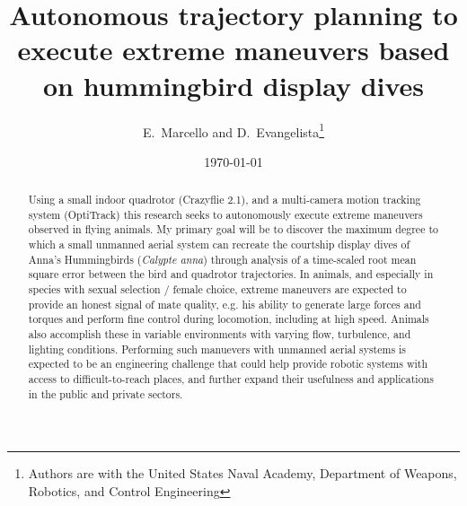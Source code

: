 \documentclass[onecolumn,10pt]{IEEEtran}
\title{Autonomous trajectory planning to execute extreme maneuvers based on hummingbird display dives}
\author{E.~Marcello and D.~Evangelista\thanks{Authors are with the United States Naval Academy, Department of Weapons, Robotics, and Control Engineering}}
\date{\today}
\begin{document}
\maketitlepage
\maketitle

\begin{abstract}
Using a small indoor quadrotor (Crazyflie 2.1), and a multi-camera motion tracking system (OptiTrack) this research seeks to autonomously execute extreme maneuvers observed in flying animals.  My primary goal will be to discover the maximum degree to which a small unmanned aerial system can recreate the courtship display dives of Anna's Hummingbirds (\emph{Calypte anna}) through analysis of a time-scaled root mean square error between the bird and quadrotor trajectories. In animals, and especially in species with sexual selection / female choice, extreme maneuvers are expected to provide an honest signal of mate quality, e.g. his ability to generate large forces and torques and perform fine control during locomotion, including at high speed. Animals also accomplish these in variable environments with varying flow, turbulence, and lighting conditions. Performing such manuevers with unmanned aerial systems is expected to be an engineering challenge that could help provide robotic systems with access to difficult-to-reach places, and further expand their usefulness and applications in the public and private sectors.



\end{abstract}
\end{document}
